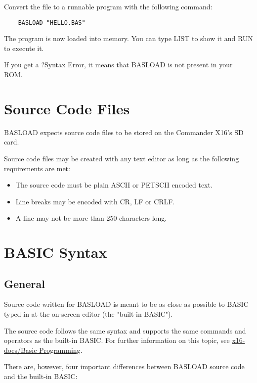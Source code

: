 \documentclass{article}
\begin{document}
    Convert the file to a runnable program with the following
    command:

    \begin{verbatim}
    BASLOAD "HELLO.BAS"
    \end{verbatim}

    The program is now loaded into memory. You can type LIST to
    show it and RUN to execute it.

    If you get a ?Syntax Error, it means that BASLOAD is not
    present in your ROM.

\section{Source Code Files}

    BASLOAD expects source code files to be stored on the 
    Commander X16's SD card.

    Source code files may be created with any text editor as
    long as the following requirements are met:

    \begin{itemize}
        \item The source code must be plain ASCII or PETSCII encoded text.
        \item Line breaks may be encoded with CR, LF or CRLF.
        \item A line may not be more than 250 characters long.
    \end{itemize}

\section{BASIC Syntax}

    \subsection{General}

        Source code written for BASLOAD is meant to be as close as
        possible to BASIC typed in at the on-screen editor
        (the "built-in BASIC").

        The source code follows the same syntax and supports the
        same commands and operators as the built-in
        BASIC. For further information on this topic, see
        \href{https://github.com/X16Community/x16-docs/blob/master/X16%20Reference%20-%2003%20-%20BASIC.md}
        {x16-docs/Basic Programming}.

        There are, however, four important differences between
        BASLOAD source code and the built-in BASIC:
\end{document}
